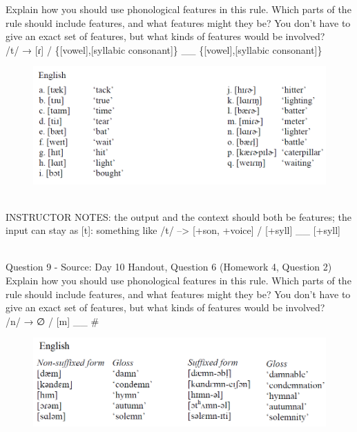 \documentclass[12pt]{article}
\begin{document}
Explain how you should use phonological features in this rule. Which parts of the rule should include features, and what features might they be? You don't have to give an exact set of features, but what kinds of features would be involved?\\

/t/ → {[ɾ]} / \{{[vowel]},{[syllabic consonant]}\} \_\_ \{{[vowel]},{[syllabic consonant]}\}

\begin{figure}[H]
\includegraphics{../images/english_t_flap.png}
\end{figure}

~\\
INSTRUCTOR NOTES: the output and the context should both be features; the input can stay as [t]: something like /t/ --> [+son, +voice] / [+syll] \_\_ [+syll]


~\\

{\large Question 9} - Source: Day 10 Handout, Question 6 (Homework 4, Question 2)\\

Explain how you should use phonological features in this rule. Which parts of the rule should include features, and what features might they be? You don't have to give an exact set of features, but what kinds of features would be involved?\\

/n/ → ∅ / {[m]} \_\_ \#

\begin{figure}[H]
\includegraphics{../images/english_stemalternations.png}
\end{figure}
\end{document}
